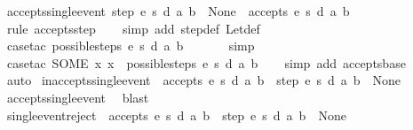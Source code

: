 \begin{isabellebody}
\ accepts{\isacharunderscore}single{\isacharunderscore}event{\isacharcolon}\ {\isachardoublequoteopen}step\ e\ s\ d\ a\ b\ {\isasymnoteq}\ None\ {\isasymLongrightarrow}\ accepts\ e\ s\ d\ {\isacharbrackleft}{\isacharparenleft}a{\isacharcomma}\ b{\isacharparenright}{\isacharbrackright}{\isachardoublequoteclose}\isanewline
%
\isadelimproof
\ \ %
\endisadelimproof
%
\isatagproof
{}\isamarkupfalse%
\ {\isacharparenleft}rule\ accepts{\isachardot}step{\isacharparenright}\isanewline
\ \ \isamarkupfalse%
\ {\isacharparenleft}simp\ add{\isacharcolon}\ step{\isacharunderscore}def\ Let{\isacharunderscore}def{\isacharparenright}\isanewline
\ \ \isamarkupfalse%
\ {\isacharparenleft}case{\isacharunderscore}tac\ {\isachardoublequoteopen}possible{\isacharunderscore}steps\ e\ s\ d\ a\ b\ {\isacharequal}\ {\isacharbraceleft}{\isacharbar}{\isacharbar}{\isacharbraceright}{\isachardoublequoteclose}{\isacharparenright}\isanewline
\ \ \ \isamarkupfalse%
\ simp\isanewline
\ \ \isamarkupfalse%
\ {\isacharparenleft}case{\isacharunderscore}tac\ {\isachardoublequoteopen}SOME\ x{\isachardot}\ x\ {\isacharbar}{\isasymin}{\isacharbar}\ possible{\isacharunderscore}steps\ e\ s\ d\ a\ b{\isachardoublequoteclose}{\isacharparenright}\isanewline
\ \ \isamarkupfalse%
\ {\isacharparenleft}simp\ add{\isacharcolon}\ accepts{\isachardot}base{\isacharparenright}\isanewline
\ \ \isamarkupfalse%
\ auto%
\endisatagproof
{\isafoldproof}%
%
\isadelimproof
\isanewline
%
\endisadelimproof
\isanewline
{}\isamarkupfalse%
\ inaccepts{\isacharunderscore}single{\isacharunderscore}event{\isacharcolon}\ {\isachardoublequoteopen}{\isasymnot}\ accepts\ e\ s\ d\ {\isacharbrackleft}{\isacharparenleft}a{\isacharcomma}\ b{\isacharparenright}{\isacharbrackright}\ {\isasymLongrightarrow}\ step\ e\ s\ d\ a\ b\ {\isacharequal}\ None{\isachardoublequoteclose}\isanewline
%
\isadelimproof
\ \ %
\endisadelimproof
%
\isatagproof
{}\isamarkupfalse%
\ accepts{\isacharunderscore}single{\isacharunderscore}event\ \isamarkupfalse%
\ blast%
\endisatagproof
{\isafoldproof}%
%
\isadelimproof
\isanewline
%
\endisadelimproof
\isanewline
{}\isamarkupfalse%
\ single{\isacharunderscore}event{\isacharunderscore}reject{\isacharcolon}\ {\isachardoublequoteopen}{\isasymnot}\ accepts\ e\ s\ d\ {\isacharbrackleft}{\isacharparenleft}a{\isacharcomma}\ b{\isacharparenright}{\isacharbrackright}\ {\isacharequal}\ {\isacharparenleft}step\ e\ s\ d\ a\ b\ {\isacharequal}\ None{\isacharparenright}{\isachardoublequoteclose}\isanewline

\end{isabellebody}
